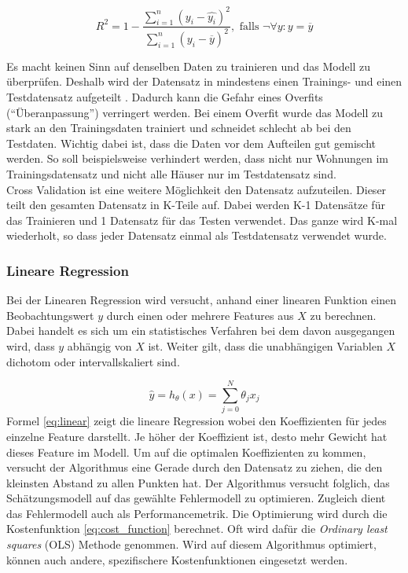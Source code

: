 \begin{equation}\label{eq:r2}
R^2 = 1 - \frac{\sum_{i=1}^{n} (y_i - \hat{y_i})^2}{\sum_{i=1}^{n}(y_i - \overline{y})^2},\text{ falls } \neg \forall y:y = \overline{y}
\end{equation}

Es macht keinen Sinn auf denselben Daten zu trainieren und das Modell zu überprüfen. Deshalb wird der Datensatz in mindestens einen Trainings- und einen Testdatensatz aufgeteilt \cite{cross_validation}.
Dadurch kann die Gefahr eines Overfits (“Überanpassung”) verringert werden. Bei einem Overfit wurde das Modell zu stark an den Trainingsdaten trainiert und schneidet schlecht ab bei den Testdaten. Wichtig dabei ist, dass die Daten vor dem Aufteilen gut gemischt werden. So soll beispielsweise verhindert werden, dass nicht nur Wohnungen im Trainingsdatensatz und nicht alle Häuser nur im Testdatensatz sind.\\
Cross Validation ist eine weitere Möglichkeit den Datensatz aufzuteilen. Dieser teilt den gesamten Datensatz in K-Teile auf. Dabei werden K-1 Datensätze für das Trainieren und 1 Datensatz für das Testen verwendet. Das ganze wird K-mal wiederholt, so dass jeder Datensatz einmal als Testdatensatz verwendet wurde.
%
\subsubsection{Lineare Regression}
Bei der Linearen Regression wird versucht, anhand einer linearen Funktion einen Beobachtungswert $y$ durch einen oder mehrere Features aus $X$ zu berechnen. Dabei handelt es sich um ein statistisches Verfahren bei dem davon ausgegangen wird, dass $y$ abhängig von $X$ ist. Weiter gilt, dass die unabhängigen Variablen $X$ dichotom oder intervallskaliert sind.

\begin{equation}\label{eq:linear}
\hat{y} = h_\theta(x) = \sum_{j=0}^{N} \theta_j x_j
\end{equation}
Formel \eqref{eq:linear} zeigt die lineare Regression wobei  den Koeffizienten für jedes einzelne Feature darstellt. Je höher der Koeffizient ist, desto mehr Gewicht hat dieses Feature im Modell. Um auf die optimalen Koeffizienten zu kommen, versucht der Algorithmus eine Gerade durch den Datensatz zu ziehen, die den kleinsten Abstand zu allen Punkten hat. Der Algorithmus versucht folglich, das Schätzungsmodell auf das gewählte Fehlermodell zu optimieren. Zugleich dient das Fehlermodell auch als Performancemetrik. Die Optimierung wird durch die Kostenfunktion \eqref{eq:cost_function} berechnet. Oft wird dafür die \textit{Ordinary least squares} (OLS) Methode genommen. Wird auf diesem Algorithmus optimiert, können auch andere, spezifischere Kostenfunktionen eingesetzt werden.

